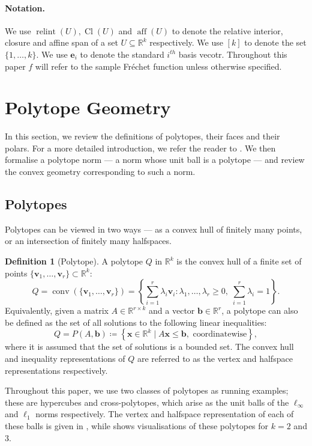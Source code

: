 \documentclass[10pt]{article}
\theoremstyle{definition}
\newtheorem{definition}[theorem]{Definition}
\theoremstyle{remark}
\newcommand{\R}{\mathbb{R}}
\DeclareMathOperator{\conv}{conv}
\DeclareMathOperator{\relint}{relint}
\DeclareMathOperator{\closure}{Cl}
\DeclareMathOperator{\aff}{aff}
\renewcommand{\vec}[1]{\mathbf{#1}}
\newcommand{\mb}[1]{\mathbb #1}
\begin{document}
	\paragraph{Notation.} We use $\relint(U), \closure(U)$ and $\aff(U)$ to denote the relative interior, closure and affine span of a set $U \subseteq \mb{R}^k$ respectively. We use $[k]$ to denote the set $\{1,\ldots,k\}$. We use $\vec e_i$ to denote the standard $i^{th}$ basis vecotr. Throughout this paper $f$ will refer to the sample Fr\'echet function unless otherwise specified.
	
	\section{Polytope Geometry} \label{sec:polytope_geometry}
	
	In this section, we review the definitions of polytopes, their faces and their polars. For a more detailed introduction, we refer the reader to \cite{ziegler2012lectures}. We then formalise a polytope norm --- a norm whose unit ball is a polytope --- and review the convex geometry corresponding to such a norm.
	
	\subsection{Polytopes}
	
	Polytopes can be viewed in two ways --- as a convex hull of finitely many points, or an intersection of finitely many halfspaces. 
	
	\begin{definition}[Polytope]
		A polytope $Q$ in $\R^k$ is the convex hull of a finite set of points $\{ \vec v_1, \dots, \vec v_r \} \subset \mathbb{R}^k$:
		\[
		Q = \conv(\{ \vec v_1, \dots, \vec v_r \}) = \left\{ \sum_{i=1}^r \lambda_i \vec v_i: \lambda_1, \dots, \lambda_r \geq 0, 
		\; \sum_{i=1}^r \lambda_i = 1 \right\}.
		\]
		Equivalently, given a matrix  $A \in \R^{r \times k}$ and a vector $\vec b \in \R^r$, a polytope can also be defined as the set of all solutions to the following linear inequalities:
		\[
		Q = P(A, \vec b) \coloneqq \left \{ \vec x \in \R^k \; |
		\; A \vec x \leq \vec b, \text{ coordinatewise} \right\},
		\]
		where it is assumed that the set of solutions is a bounded set. The convex hull and inequality representations of $Q$ are referred to as the vertex and halfspace representations respectively.
	\end{definition}
	
	Throughout this paper, we use two classes of polytopes as running examples; these are hypercubes and cross-polytopes, which arise as the unit balls of the $\ell_{\infty}$ and $\ell_1$ norms respectively. The vertex and halfspace representation of each of these balls is given in , while  shows visualisations of these polytopes for $k=2$ and 3.
	
\end{document}
